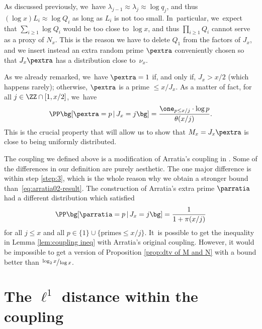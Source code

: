 \begin{enumeratea}
\item\label{rem:couplinga}
As discussed previously, we~have $\lambda_{j-1}\approx \lambda_j\approx \log q_j$, and thus $(\log x)L_i \approx \log Q_i$ as long as $L_i$ is not too small. In~particular, we~expect that $\sum_{i \ge 1} \log Q_i$ would be too close to $\log x$, and thus $\prod_{i\ge1}Q_i$ cannot serve as a proxy of $N_x$. This is the reason we have to delete $Q_1$ from the factors of $J_x$, and we insert instead an extra random prime $\pextra$ conveniently chosen so that $J_x\pextra$ has a distribution close to~$\nu_x$.

As we already remarked, we~have $\pextra=1$ if, and only if, $J_x > x/2$ (which happens rarely); otherwise, $\pextra$ is a prime $\le x/J_x$. As a matter of fact, for all $j\in\ZZ\cap[1,x/2]$, we~have
\begin{equation}
\label{eq:distribution of Pextra}
\PP\bg[\pextra = p\,|\, J_x = j\bg] = \frac{\one_{p\le x/j}\cdot\log p}{\theta(x/j)}.
\end{equation}
This is the crucial property that will allow us to show that $M_x=J_x\pextra$ is close to being uniformly distributed.

\item\label{rem:couplingb}
The coupling we defined above is a modification of Arratia's coupling in \cite{Arratia02}. Some of the differences in our definition are purely aesthetic. The one major difference is within step \eqref{step:3}, which is the whole reason why we obtain a stronger bound than~\eqref{eq:arratia02-result}. The construction of Arratia's extra prime $\parratia$ had a different distribution which satisfied
\begin{equation}
\label{eq:extraprime-arratia}
\PP\bg[\parratia = p\,|\, J_x=j\bg] = \frac{1}{1+\pi(x/j)}
\end{equation}
for all $j\le x$ and all $p \in \{1\}\cup\{\text{primes}\le x/j\}$. It~is possible to get the inequality in Lemma \ref{lem:coupling ineq} with Arratia's original coupling. However, it would be impossible to get a version of Proposition \ref{prop:dtv of M and N} with a bound better than $\sfrac{\log_2x}{\log x}$.
\end{enumeratea}

\section{The \texorpdfstring{$\ell^1$}{l1} distance within the coupling}\label{sec:proof of Lemma coupling ineq}

